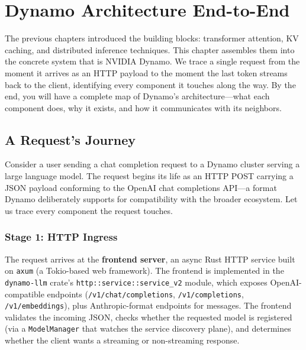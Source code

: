 \chapter{Dynamo Architecture End-to-End}
\label{ch:architecture}

The previous chapters introduced the building blocks: transformer attention, KV caching, and distributed inference techniques. This chapter assembles them into the concrete system that is NVIDIA Dynamo. We trace a single request from the moment it arrives as an HTTP payload to the moment the last token streams back to the client, identifying every component it touches along the way. By the end, you will have a complete map of Dynamo's architecture---what each component does, why it exists, and how it communicates with its neighbors.

\section{A Request's Journey}
\label{sec:architecture:journey}

%
Consider a user sending a chat completion request to a Dynamo cluster serving a large language model. The request begins its life as an HTTP POST carrying a JSON payload conforming to the OpenAI chat completions API---a format Dynamo deliberately supports for compatibility with the broader ecosystem. Let us trace every component the request touches.

\subsection{Stage 1: HTTP Ingress}

The request arrives at the \textbf{frontend server}, an async Rust HTTP service built on \texttt{axum} (a Tokio-based web framework). The frontend is implemented in the \texttt{dynamo-llm} crate's \texttt{http::\allowbreak service::\allowbreak service\_v2} module, which exposes OpenAI-compatible endpoints (\texttt{/v1/chat/\allowbreak completions}, \texttt{/v1/\allowbreak completions}, \texttt{/v1/\allowbreak embeddings}), plus Anthropic-format endpoints for messages. The frontend validates the incoming JSON, checks whether the requested model is registered (via a \texttt{ModelManager} that watches the service discovery plane), and determines whether the client wants a streaming or non-streaming response.

